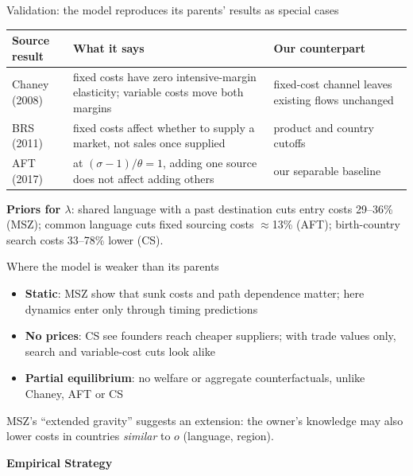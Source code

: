 \documentclass[notes,11pt, aspectratio=169]{beamer}
\newenvironment{transitionframe}{
  \setbeamercolor{background canvas}{bg=yellow}
  \begin{frame}}{
    \end{frame}
}
\begin{document}
\begin{frame}{Validation: the model reproduces its parents' results as special cases}
\footnotesize
\renewcommand{\arraystretch}{1.25}
\begin{tabularx}{\textwidth}{@{}>{\raggedright\arraybackslash}p{2.4cm}Y>{\raggedright\arraybackslash}p{4.2cm}@{}}
\toprule
\textbf{Source result} & \textbf{What it says} & \textbf{Our counterpart}\\
\midrule
Chaney (2008) & fixed costs have zero intensive-margin elasticity; variable costs move both margins & fixed-cost channel leaves existing flows unchanged\\
BRS (2011) & fixed costs affect whether to supply a market, not sales once supplied & product and country cutoffs\\
AFT (2017) & at $(\sigma-1)/\theta=1$, adding one source does not affect adding others & our separable baseline\\
\bottomrule
\end{tabularx}
\pause
\vspace{0.2cm}

\small
\textbf{Priors for $\lambda$}: shared language with a past destination cuts entry costs 29--36\% (MSZ); common language cuts fixed sourcing costs $\approx$13\% (AFT); birth-country search costs 33--78\% lower (CS).
\end{frame}


\begin{frame}{Where the model is weaker than its parents}
\begin{itemize}\setlength{\itemsep}{8pt}
\item \textbf{Static}: MSZ show that sunk costs and path dependence matter; here dynamics enter only through timing predictions
\item \textbf{No prices}: CS see founders reach cheaper suppliers; with trade values only, search and variable-cost cuts look alike
\item \textbf{Partial equilibrium}: no welfare or aggregate counterfactuals, unlike Chaney, AFT or CS
\end{itemize}
\pause
\vspace{0.2cm}
MSZ's ``extended gravity'' suggests an extension: the owner's knowledge may also lower costs in countries \emph{similar} to $o$ (language, region).
\end{frame}

\begin{transitionframe}
\centering\vfill{\Huge\bfseries Empirical Strategy}\vfill
\end{transitionframe}
\end{document}
